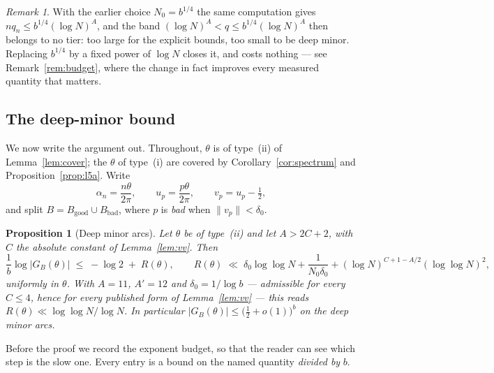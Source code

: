 \documentclass[11pt,a4paper]{article}
\theoremstyle{plain}
\newtheorem{proposition}[theorem]{Proposition}
\theoremstyle{definition}
\theoremstyle{remark}
\newtheorem{remark}[theorem]{Remark}
\begin{document}
\begin{remark}\label{rem:whyN0}
With the earlier choice $N_0=b^{1/4}$ the same computation gives
$nq_n\le b^{1/4}(\log N)^{A}$, and the band
$(\log N)^{A}<q\le b^{1/4}(\log N)^{A}$ then belongs to no tier: too large for
the explicit bounds, too small to be deep minor. Replacing $b^{1/4}$ by a fixed
power of $\log N$ closes it, and costs nothing --- see
Remark~\ref{rem:budget}, where the change in fact improves every measured
quantity that matters.
\end{remark}

\subsection{The deep-minor bound}

We now write the argument out. Throughout, $\theta$ is of type~(ii) of
Lemma~\ref{lem:cover}; the $\theta$ of type~(i) are covered by
Corollary~\ref{cor:spectrum} and Proposition~\ref{prop:l5a}. Write
\[
  \alpha_n=\frac{n\theta}{2\pi},\qquad
  u_p=\frac{p\theta}{2\pi},\qquad
  v_p=u_p-\tfrac12 ,
\]
and split $B=B_{\mathrm{good}}\cup B_{\mathrm{bad}}$, where $p$ is \emph{bad}
when $\|v_p\|<\delta_0$.

\begin{proposition}[Deep minor arcs]\label{prop:deepminor}
Let $\theta$ be of type~\textup{(ii)} and let $A>2C+2$, with $C$ the absolute
constant of Lemma~\ref{lem:vv}. Then
\[
  \frac1b\log|G_B(\theta)|\;\le\;-\log2\;+\;R(\theta),
  \qquad
  R(\theta)\;\ll\;\delta_0\log\log N+\frac{1}{N_0\delta_0}
    +(\log N)^{C+1-A/2}(\log\log N)^{2},
\]
uniformly in $\theta$. With $A=11$, $A'=12$ and $\delta_0=1/\log b$ --- admissible
for every $C\le4$, hence for every published form of Lemma~\ref{lem:vv} --- this
reads $R(\theta)\ll\log\log N/\log N$. In particular
$|G_B(\theta)|\le\bigl(\tfrac12+o(1)\bigr)^{b}$ on the deep minor arcs.
\end{proposition}

\noindent
Before the proof we record the exponent budget, so that the reader can see which
step is the slow one. Every entry is a bound on the named quantity \emph{divided
by} $b$.
\end{document}
